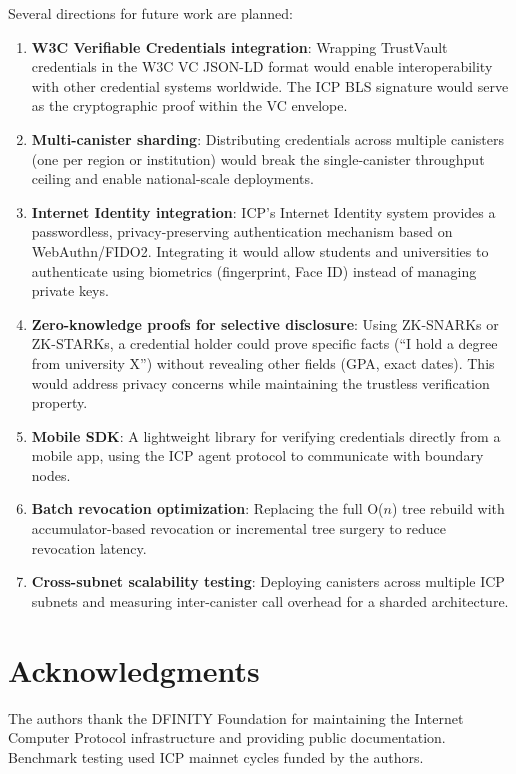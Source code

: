 \documentclass[journal]{IEEEtran}
\begin{document}
Several directions for future work are planned:

\begin{enumerate}
  \item \textbf{W3C Verifiable Credentials integration}: Wrapping TrustVault credentials in the W3C VC JSON-LD format would enable interoperability with other credential systems worldwide. The ICP BLS signature would serve as the cryptographic proof within the VC envelope.
  \item \textbf{Multi-canister sharding}: Distributing credentials across multiple canisters (one per region or institution) would break the single-canister throughput ceiling and enable national-scale deployments.
  \item \textbf{Internet Identity integration}: ICP's Internet Identity system provides a passwordless, privacy-preserving authentication mechanism based on WebAuthn/FIDO2. Integrating it would allow students and universities to authenticate using biometrics (fingerprint, Face ID) instead of managing private keys.
  \item \textbf{Zero-knowledge proofs for selective disclosure}: Using ZK-SNARKs or ZK-STARKs, a credential holder could prove specific facts (``I hold a degree from university X'') without revealing other fields (GPA, exact dates). This would address privacy concerns while maintaining the trustless verification property.
  \item \textbf{Mobile SDK}: A lightweight library for verifying credentials directly from a mobile app, using the ICP agent protocol to communicate with boundary nodes.
  \item \textbf{Batch revocation optimization}: Replacing the full O($n$) tree rebuild with accumulator-based revocation or incremental tree surgery to reduce revocation latency.
  \item \textbf{Cross-subnet scalability testing}: Deploying canisters across multiple ICP subnets and measuring inter-canister call overhead for a sharded architecture.
\end{enumerate}

\section*{Acknowledgments}
The authors thank the DFINITY Foundation for maintaining the Internet Computer Protocol infrastructure and providing public documentation. Benchmark testing used ICP mainnet cycles funded by the authors.
\end{document}
